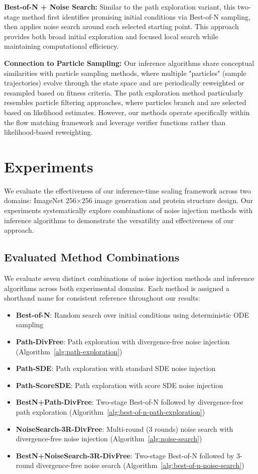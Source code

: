 \documentclass{article}
\begin{document}
\textbf{Best-of-N + Noise Search:} Similar to the path exploration variant, this two-stage method first identifies promising initial conditions via Best-of-N sampling, then applies noise search around each selected starting point. This approach provides both broad initial exploration and focused local search while maintaining computational efficiency.

\textbf{Connection to Particle Sampling:} Our inference algorithms share conceptual similarities with particle sampling methods, where multiple "particles" (sample trajectories) evolve through the state space and are periodically reweighted or resampled based on fitness criteria. The path exploration method particularly resembles particle filtering approaches, where particles branch and are selected based on likelihood estimates. However, our methods operate specifically within the flow matching framework and leverage verifier functions rather than likelihood-based reweighting.

\section{Experiments}

We evaluate the effectiveness of our inference-time scaling framework across two domains: ImageNet 256×256 image generation and protein structure design. Our experiments systematically explore combinations of noise injection methods with inference algorithms to demonstrate the versatility and effectiveness of our approach.

\subsection{Evaluated Method Combinations}

We evaluate seven distinct combinations of noise injection methods and inference algorithms across both experimental domains. Each method is assigned a shorthand name for consistent reference throughout our results:

\begin{itemize}
\item \textbf{Best-of-N}: Random search over initial conditions using deterministic ODE sampling
\item \textbf{Path-DivFree}: Path exploration with divergence-free noise injection (Algorithm~\ref{alg:path-exploration})
\item \textbf{Path-SDE}: Path exploration with standard SDE noise injection 
\item \textbf{Path-ScoreSDE}: Path exploration with score SDE noise injection
\item \textbf{BestN+Path-DivFree}: Two-stage Best-of-N followed by divergence-free path exploration (Algorithm~\ref{alg:best-of-n-path-exploration})
\item \textbf{NoiseSearch-3R-DivFree}: Multi-round (3 rounds) noise search with divergence-free noise injection (Algorithm~\ref{alg:noise-search})
\item \textbf{BestN+NoiseSearch-3R-DivFree}: Two-stage Best-of-N followed by 3-round divergence-free noise search (Algorithm~\ref{alg:best-of-n-noise-search})
\end{itemize}
\end{document}
